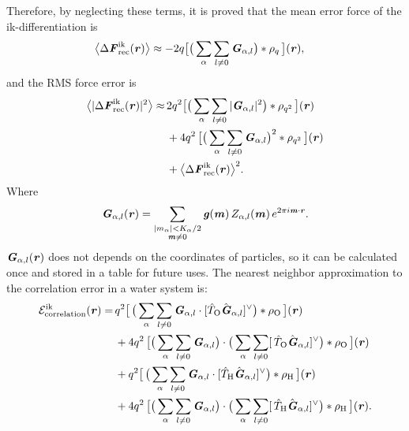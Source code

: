 \documentclass[journal=jacsat,manuscript=article]{achemso}
\renewcommand{\v}[1]{\textbf{\textit{#1}}}
\begin{document}
Therefore, by neglecting these terms, it is proved that the mean error
force of the ik-differentiation is
\begin{align}\label{eqn:ik.meanf}
  \big\langle
  \Delta\v F_{\textrm{rec}}^{\textrm{ik}}(\v r)
  \big\rangle
  & \approx
  - 2 q
  \big[
  \big(
  \sum_{\alpha}\sum_{l\neq 0}\v G_{\alpha,l}
  \big)
  \ast\rho_q\,
  \big] (\v r),
\end{align}
and the RMS force error is 
\begin{align}\nonumber
  \big\langle
  \vert\Delta\v F_{\textrm{rec}}^{\textrm{ik}}(\v r)\vert^2
  \big\rangle
  \approx&\, 
  2q^2
  \big[
  \big(
  \sum_{\alpha} \sum_{l\neq 0}
  \vert \v G_{\alpha,l}\vert^2
  \big)
  \ast \rho_{q^2}
  \,\big] (\v r)\\\nonumber
  &\,+
  4q^2\,
  \big[
  \big(
  \sum_{\alpha} \sum_{l\neq 0}  
  \v G_{\alpha,l}
  \big)^2
  \ast \rho_{q^2}\,
  \big] (\v r) \\\label{eqn:ik.error}
  &\,+
  \big\langle
  \Delta\v F_{\textrm{rec}}^{\textrm{ik}}(\v r)
  \big\rangle^2.
\end{align}
Where
\begin{align}
  \v G_{\alpha,l}(\v r) =
  \sum_{
    \begin{subarray}{c}
      \vert m_{\alpha}\vert < K_\alpha/2\\
      \v m\neq 0
    \end{subarray}}
  \v g(\v m)\,
  Z_{\alpha,l}(\v m)\,
  e^{2\pi i\v m\cdot\v r}.
\end{align}
$\v G_{\alpha,l}(\v r)$ does not depends on the coordinates of particles,
so it can be calculated once and stored in a table for future uses.
The nearest neighbor approximation to the correlation error
in a water system is:
\begin{align}\nonumber
  \mathcal E^{\textrm{ik}}_{\textrm{correlation}}(\v r)
  =\,&
  q^2
  \big[\,
  \big(
  \sum_{\alpha} \sum_{l\neq 0}
  \v G_{\alpha,l}\cdot[\hat T_{\textrm{O}}\hat{\v G}_{\alpha,l}]^{\vee}
  \big)
  \ast \rho_{\textrm{O}}
  \,\big] (\v r) \\\nonumber
  \,&+
  4q^2\,
  \big[
  \big(
  \sum_{\alpha} \sum_{l\neq 0}  
  \v G_{\alpha,l}
  \big)
  \cdot
  \big(
  \sum_{\alpha} \sum_{l\neq 0}  
  [\,\hat T_{\textrm{O}}\hat{\v G}_{\alpha,l}]^{\vee}
  \big)
  \ast \rho_{\textrm{O}}\,
  \big] (\v r) \\\nonumber
  \,&+
  q^2
  \big[\,
  \big(
  \sum_{\alpha} \sum_{l\neq 0}
  \v G_{\alpha,l}\cdot[\hat T_{\textrm{H}}\hat{\v G}_{\alpha,l}]^{\vee}
  \big)
  \ast \rho_{\textrm{H}}
  \,\big] (\v r) \\
  \,&+
  4q^2\,
  \big[
  \big(
  \sum_{\alpha} \sum_{l\neq 0}  
  \v G_{\alpha,l}
  \big)
  \cdot
  \big(
  \sum_{\alpha} \sum_{l\neq 0}  
  [\,\hat T_{\textrm{H}}\hat{\v G}_{\alpha,l}]^{\vee}
  \big)
  \ast \rho_{\textrm{H}}\,
  \big] (\v r).
\end{align}
\end{document}
